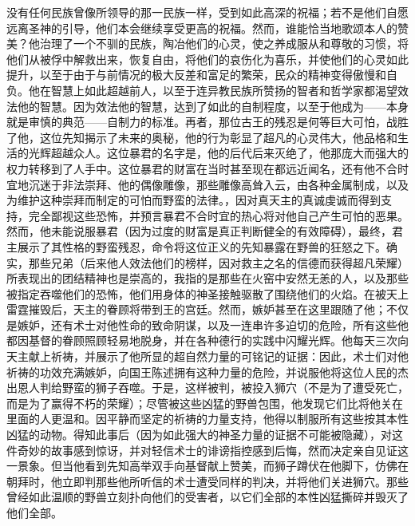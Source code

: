 没有任何民族曾像所领导的那一民族一样，受到如此高深的祝福；若不是他们自愿远离圣神的引导，他们本会继续享受更高的祝福。然而，谁能恰当地歌颂本人的赞美？他治理了一个不驯的民族，陶冶他们的心灵，使之养成服从和尊敬的习惯，将他们从被俘中解救出来，恢复自由，将他们的哀伤化为喜乐，并使他们的心灵如此提升，以至于由于与前情况的极大反差和富足的繁荣，民众的精神变得傲慢和自负。他在智慧上如此超越前人，以至于连异教民族所赞扬的智者和哲学家都渴望效法他的智慧。因为效法他的智慧，达到了如此的自制程度，以至于他成为——本身就是审慎的典范——自制力的标准。再者，那位古王的残忍是何等巨大可怕，战胜了他，这位先知揭示了未来的奥秘，他的行为彰显了超凡的心灵伟大，他品格和生活的光辉超越众人。这位暴君的名字是，他的后代后来灭绝了，他那庞大而强大的权力转移到了人手中。这位暴君的财富在当时甚至现在都远近闻名，还有他不合时宜地沉迷于非法崇拜、他的偶像雕像，那些雕像高耸入云，由各种金属制成，以及为维护这种崇拜而制定的可怕而野蛮的法律。，因对真天主的真诚虔诚而得到支持，完全鄙视这些恐怖，并预言暴君不合时宜的热心将对他自己产生可怕的恶果。然而，他未能说服暴君（因为过度的财富是真正判断健全的有效障碍），最终，君主展示了其性格的野蛮残忍，命令将这位正义的先知暴露在野兽的狂怒之下。确实，那些兄弟（后来他人效法他们的榜样，因对救主之名的信德而获得超凡荣耀）所表现出的团结精神也是崇高的，我指的是那些在火窑中安然无恙的人，以及那些被指定吞噬他们的恐怖，他们用身体的神圣接触驱散了围绕他们的火焰。在被天上雷霆摧毁后，天主的眷顾将带到王的宫廷。然而，嫉妒甚至在这里跟随了他；不仅是嫉妒，还有术士对他性命的致命阴谋，以及一连串许多迫切的危险，所有这些他都因基督的眷顾照顾轻易地脱身，并在各种德行的实践中闪耀光辉。他每天三次向天主献上祈祷，并展示了他所显的超自然力量的可铭记的证据：因此，术士们对他祈祷的功效充满嫉妒，向国王陈述拥有这种力量的危险，并说服他将这位人民的杰出恩人判给野蛮的狮子吞噬。于是，这样被判，被投入狮穴（不是为了遭受死亡，而是为了赢得不朽的荣耀）；尽管被这些凶猛的野兽包围，他发现它们比将他关在里面的人更温和。因平静而坚定的祈祷的力量支持，他得以制服所有这些按其本性凶猛的动物。得知此事后（因为如此强大的神圣力量的证据不可能被隐藏），对这件奇妙的故事感到惊讶，并对轻信术士的诽谤指控感到后悔，然而决定亲自见证这一景象。但当他看到先知高举双手向基督献上赞美，而狮子蹲伏在他脚下，仿佛在朝拜时，他立即判那些他所听信的术士遭受同样的判决，并将他们关进狮穴。那些曾经如此温顺的野兽立刻扑向他们的受害者，以它们全部的本性凶猛撕碎并毁灭了他们全部。\par

